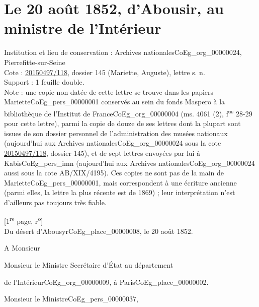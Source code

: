 \documentclass{book}
\begin{document}
\section*{Le 20 août 1852, d'Abousir, au ministre de l'Intérieur} \label{CoEg_Mariette_1852-08-20} 
{\footnotesize \noindent Institution et lieu de conservation : Archives nationales\gls{CoEg_org_00000024}, Pierrefitte-sur-Seine\\
Cote : \hyperref[CoEg_Mariette_ms_001]{20150497/118}, dossier 145 (Mariette, Auguste), lettre s. n.\\
Support : 1 feuille double.\\
Note : une copie non datée de cette lettre se trouve dans les papiers Mariette\gls{CoEg_pers_00000001} conservés au sein du fonds Maspero à la bibliothèque de l'Institut de France\gls{CoEg_org_00000004} (ms. 4061 (2), f\textsuperscript{os} 28-29 pour cette lettre), parmi la copie de douze de ses lettres dont la plupart sont issues de son dossier personnel de l'administration des musées nationaux (aujourd'hui aux Archives nationales\gls{CoEg_org_00000024} sous la cote \hyperref[CoEg_Mariette_ms_001]{20150497/118}, dossier 145), et de sept lettres envoyées par lui à Kabis\gls{CoEg_pers_imn} (aujourd'hui aux Archives nationales\gls{CoEg_org_00000024} aussi sous la cote AB/XIX/4195). Ces copies ne sont pas de la main de Mariette\gls{CoEg_pers_00000001}, mais correspondent à une écriture ancienne (parmi elles, la lettre la plus récente est de 1869) ; leur interprétation n'est d'ailleurs pas toujours très fiable.}
\begin{center} {\footnotesize[1\textsuperscript{re} page, r\textsuperscript{o}]}\\
Du désert d’Abousyr\gls{CoEg_place_00000008}, le 20 août 1852.\end{center}
\indent A Monsieur\\
\begin{center}Monsieur le Ministre Secrétaire d’État au département\end{center}
\begin{flushright}de l’Intérieur\gls{CoEg_org_00000009}, à Paris\gls{CoEg_place_00000002}.\end{flushright}

\hspace{1cm} Monsieur le Ministre\gls{CoEg_pers_00000037},\\
\end{document}
